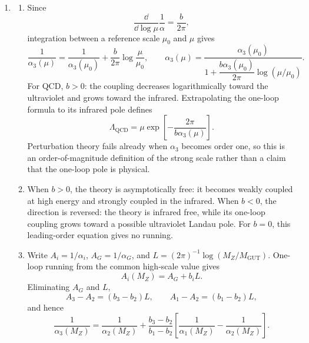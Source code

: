 \begin{enumerate}
  \begin{enumerate}
    \item[(a)]
    \begin{enumerate}
      \item[(i)]
      Since
      \[
        \frac{\dd}{\dd\log\mu}\frac1\alpha=\frac{b}{2\pi},
      \]
      integration between a reference scale \(\mu_0\) and \(\mu\) gives
      \[
        \boxed{
        \frac1{\alpha_3(\mu)}
          =\frac1{\alpha_3(\mu_0)}
           +\frac{b}{2\pi}\log\frac{\mu}{\mu_0}},
        \qquad
        \alpha_3(\mu)
          =\frac{\alpha_3(\mu_0)}{
            1+\dfrac{b\alpha_3(\mu_0)}{2\pi}
              \log(\mu/\mu_0)}.
      \]
      For QCD, \(b>0\): the coupling decreases logarithmically toward the
      ultraviolet and grows toward the infrared.  Extrapolating the one-loop
      formula to its infrared pole defines
      \[
        \boxed{\Lambda_{\mathrm{QCD}}
          =\mu\exp\!\left[-\frac{2\pi}{b\alpha_3(\mu)}\right].}
      \]
      Perturbation theory fails already when \(\alpha_3\) becomes order one,
      so this is an order-of-magnitude definition of the strong scale rather
      than a claim that the one-loop pole is physical.

      \item[(ii)]
      When \(b>0\), the theory is asymptotically free: it becomes weakly
      coupled at high energy and strongly coupled in the infrared.  When
      \(b<0\), the direction is reversed: the theory is infrared free, while
      its one-loop coupling grows toward a possible ultraviolet Landau pole.
      For \(b=0\), this leading-order equation gives no running.

      \item[(iii)]
      Write \(A_i=1/\alpha_i\), \(A_G=1/\alpha_G\), and
      \(L=(2\pi)^{-1}\log(M_Z/M_{\mathrm{GUT}})\).  One-loop running from the
      common high-scale value gives
      \[
        A_i(M_Z)=A_G+b_iL.
      \]
      Eliminating \(A_G\) and \(L\),
      \[
        A_3-A_2=(b_3-b_2)L,
        \qquad A_1-A_2=(b_1-b_2)L,
      \]
      and hence
      \[
        \boxed{
        \frac1{\alpha_3(M_Z)}
        =\frac1{\alpha_2(M_Z)}
        +\frac{b_3-b_2}{b_1-b_2}
          \left[\frac1{\alpha_1(M_Z)}
                -\frac1{\alpha_2(M_Z)}\right].}
      \]
    \end{enumerate}


\end{enumerate}
\end{enumerate}
